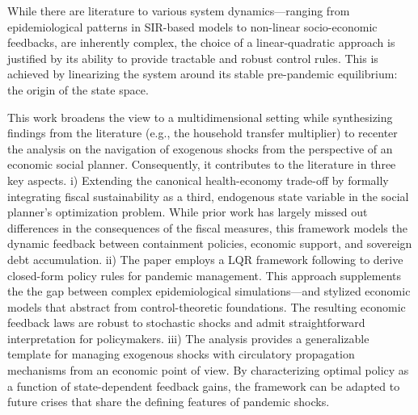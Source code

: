 \documentclass[12pt, a4paper]{article}
\begin{document}
While there are literature to various system dynamics—ranging from epidemiological patterns in SIR-based models \citep{alvarez2021, acemoglu2021} to non-linear socio-economic feedbacks, are inherently complex, the choice of a linear-quadratic approach is justified by its ability to provide tractable and robust control rules. This is achieved by linearizing the system around its stable pre-pandemic equilibrium: the origin of the state space.


This work broadens the view to a multidimensional setting while synthesizing findings from the literature (e.g., the household transfer multiplier) to recenter the analysis on the navigation of exogenous shocks from the perspective of an economic social planner. Consequently, it contributes to the literature in three key aspects. i) Extending the canonical health-economy trade-off by formally integrating fiscal sustainability as a third, endogenous state variable in the social planner's optimization problem. While prior work has largely missed out differences in the consequences of the fiscal measures, this framework models the dynamic feedback between containment policies, economic support, and sovereign debt accumulation. ii) The paper employs a LQR framework following \citep{bertsekas2017dynamic} to derive closed-form policy rules for pandemic management. This approach supplements the the gap between complex epidemiological simulations---and stylized economic models that abstract from control-theoretic foundations. The resulting economic feedback laws are robust to stochastic shocks and admit straightforward interpretation for policymakers. iii) The analysis provides a generalizable template for managing exogenous shocks with circulatory propagation mechanisms from an economic point of view. By characterizing optimal policy as a function of state-dependent feedback gains, the framework can be adapted to future crises that share the defining features of pandemic shocks.
\end{document}

